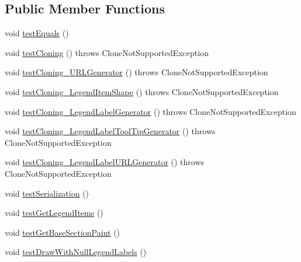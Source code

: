 \subsection*{Public Member Functions}
\begin{DoxyCompactItemize}
\item 
void \mbox{\hyperlink{classorg_1_1jfree_1_1chart_1_1plot_1_1_pie_plot_test_ad0e2097d4a0f56a5dce86d1005d55f94}{test\+Equals}} ()
\item 
void \mbox{\hyperlink{classorg_1_1jfree_1_1chart_1_1plot_1_1_pie_plot_test_a61185927a80abd5cefd66b6919331d24}{test\+Cloning}} ()  throws Clone\+Not\+Supported\+Exception 
\item 
void \mbox{\hyperlink{classorg_1_1jfree_1_1chart_1_1plot_1_1_pie_plot_test_ac59c3c5e1be32d19e36338e40c7d4222}{test\+Cloning\+\_\+\+U\+R\+L\+Generator}} ()  throws Clone\+Not\+Supported\+Exception 
\item 
void \mbox{\hyperlink{classorg_1_1jfree_1_1chart_1_1plot_1_1_pie_plot_test_ae672ed45a3b693d31c18762a817ac43b}{test\+Cloning\+\_\+\+Legend\+Item\+Shape}} ()  throws Clone\+Not\+Supported\+Exception 
\item 
void \mbox{\hyperlink{classorg_1_1jfree_1_1chart_1_1plot_1_1_pie_plot_test_a55412691c647024e855f0d16a3d0d751}{test\+Cloning\+\_\+\+Legend\+Label\+Generator}} ()  throws Clone\+Not\+Supported\+Exception 
\item 
void \mbox{\hyperlink{classorg_1_1jfree_1_1chart_1_1plot_1_1_pie_plot_test_a09b9b7780dd898d072221538acd12e1c}{test\+Cloning\+\_\+\+Legend\+Label\+Tool\+Tip\+Generator}} ()  throws Clone\+Not\+Supported\+Exception 
\item 
void \mbox{\hyperlink{classorg_1_1jfree_1_1chart_1_1plot_1_1_pie_plot_test_adfb5018c833b077629490e03904f30c0}{test\+Cloning\+\_\+\+Legend\+Label\+U\+R\+L\+Generator}} ()  throws Clone\+Not\+Supported\+Exception 
\item 
void \mbox{\hyperlink{classorg_1_1jfree_1_1chart_1_1plot_1_1_pie_plot_test_aa8b1579f066aee4e75093e65887b28c3}{test\+Serialization}} ()
\item 
void \mbox{\hyperlink{classorg_1_1jfree_1_1chart_1_1plot_1_1_pie_plot_test_ab14913dea2b7aa3a6c68a9dbcbab2870}{test\+Get\+Legend\+Items}} ()
\item 
void \mbox{\hyperlink{classorg_1_1jfree_1_1chart_1_1plot_1_1_pie_plot_test_ac1fddff55db37a1089e79f6b14e6e001}{test\+Get\+Base\+Section\+Paint}} ()
\item 
void \mbox{\hyperlink{classorg_1_1jfree_1_1chart_1_1plot_1_1_pie_plot_test_a21377e85e173f87fa9708cc41e70c5a3}{test\+Draw\+With\+Null\+Legend\+Labels}} ()

\end{DoxyCompactItemize}
